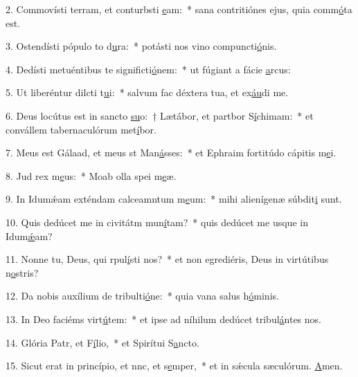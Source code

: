 2. Commovísti terram, et conturbsti \uline{e}am:~* sana contritiónes ejus, quia comm\uline{ó}ta est.\par 
3. Ostendísti pópulo to d\uline{u}ra:~* potásti nos vino compuncti\uline{ó}nis.\par 
4. Dedísti metuéntibus te significti\uline{ó}nem:~* ut fúgiant a fácie \uline{a}rcus:\par 
5. Ut liberéntur dilcti t\uline{u}i:~* salvum fac déxtera tua, et ex\uline{áu}di me.\par 
6. Deus locútus est in sancto \uline{su}o:~† Lætábor, et partbor S\uline{í}chimam:~* et convállem tabernaculórum met\uline{í}bor.\par 
7. Meus est Gálaad, et meus st Man\uline{á}sses:~* et Ephraim fortitúdo cápitis m\uline{e}i.\par 
8. Jud rex m\uline{e}us:~* Moab olla spei m\uline{e}æ.\par 
9. In Idumǽam exténdam calceamntum m\uline{e}um:~* mihi alienígenæ súbdit\uline{i} sunt.\par 
10. Quis dedúcet me in civitátm mun\uline{í}tam?~* quis dedúcet me usque in Idum\uline{ǽ}am?\par 
11. Nonne tu, Deus, qui rpul\uline{í}sti nos?~* et non egrediéris, Deus in virtútibus n\uline{o}stris?\par 
12. Da nobis auxílium de tribulti\uline{ó}ne:~* quia vana salus h\uline{ó}minis.\par 
13. In Deo faciéms virt\uline{ú}tem:~* et ipse ad níhilum dedúcet tribul\uline{á}ntes nos.\par 
14. Glória Patr, et F\uline{í}lio,~* et Spirítui S\uline{a}ncto.\par 
15. Sicut erat in princípio, et nnc, et s\uline{e}mper,~* et in sǽcula sæculórum. \uline{A}men.\par 
